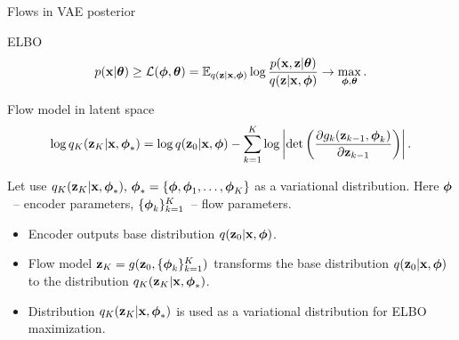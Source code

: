 \begin{frame}{Flows in VAE posterior}
\begin{block}{ELBO}
	\vspace{-0.3cm}
	\[
	p(\mathbf{x} | \boldsymbol{\theta}) \geq \mathcal{L} (\boldsymbol{\phi}, \boldsymbol{\theta})  = \mathbb{E}_{q(\mathbf{z} | \mathbf{x}, \boldsymbol{\phi})} \log \frac{p(\mathbf{x}, \mathbf{z} | \boldsymbol{\theta})}{q(\mathbf{z}| \mathbf{x}, \boldsymbol{\phi})} \rightarrow \max_{\boldsymbol{\phi}, \boldsymbol{\theta}}.
	\]
	\vspace{-0.5cm}
\end{block}
\begin{block}{Flow model in latent space}
	\vspace{-0.7cm}
	\[
	\log q_K(\mathbf{z}_K | \mathbf{x}, \boldsymbol{\phi}_*) = \log q(\mathbf{z}_0 | \mathbf{x}, \boldsymbol{\phi}) - \sum_{k=1}^K \log \left| \det \left( \frac{\partial g_k(\mathbf{z}_{k - 1}, \boldsymbol{\phi}_k)}{\partial \mathbf{z}_{k-1}} \right) \right|.
	\]
	\vspace{-0.5cm}
\end{block}
Let use $q_K(\mathbf{z}_K | \mathbf{x}, \boldsymbol{\phi}_*), \, \boldsymbol{\phi}_* = \{\boldsymbol{\phi}, \boldsymbol{\phi}_1, \dots, \boldsymbol{\phi}_K\}$ as a variational distribution. Here $\boldsymbol{\phi}$~-- encoder parameters, $\{\boldsymbol{\phi}_k\}_{k=1}^K$~-- flow parameters.

\begin{itemize}
	\item Encoder outputs base distribution $q(\mathbf{z}_0 | \mathbf{x}, \boldsymbol{\phi})$.
	\item Flow model $\mathbf{z}_K = g(\mathbf{z}_0, \{\boldsymbol{\phi}_k\}_{k=1}^K)$ transforms the base distribution $q(\mathbf{z}_0 | \mathbf{x}, \boldsymbol{\phi})$ to the distribution $q_K(\mathbf{z}_K | \mathbf{x}, \boldsymbol{\phi}_*)$.
	\item Distribution $q_K(\mathbf{z}_K | \mathbf{x}, \boldsymbol{\phi}_*)$ is used as a variational distribution for ELBO maximization.
\end{itemize}

\end{frame}
